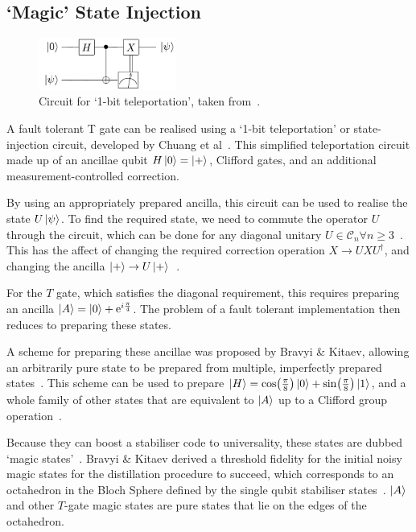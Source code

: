 \documentclass{standalone}
\begin{document}
\subsection{`Magic' State Injection}\label{sec:msi}
\begin{figure}
    \centering
    \includegraphics[width=0.4\textwidth]{Figures/1-bit-Teleport.png}
\caption{Circuit for `1-bit teleportation', taken from~\cite{Zhou2000}.}
\label{fig:MSI}
\end{figure}
A fault tolerant T gate can be realised using a `1-bit teleportation' or state-injection circuit, developed by Chuang et al~\cite{Zhou2000}. This simplified teleportation circuit made up of an ancillae qubit $H\ket{0}=\ket{+}$, Clifford gates, and an additional measurement-controlled correction.
\par
By using an appropriately prepared ancilla, this circuit can be used to realise the state $U\ket{\psi}$. To find the required state, we need to commute the operator $U$ through the circuit, which can be done for any diagonal unitary $U\in\mathcal{C}_{n}\forall n\geq 3$~\cite{Zhou2000}. This has the affect of changing the required correction operation $X\rightarrow UXU^{\dagger}$, and changing the ancilla $\ket{+}\rightarrow U\ket{+}$~\cite{Zhou2000}.
\par
For the $T$ gate, which satisfies the diagonal requirement, this requires preparing an ancilla $\ket{A}=\ket{0}+\mathrm{e}^{i\frac{\pi}{4}}$. The problem of a fault tolerant implementation then reduces to preparing these states.
\par
A scheme for preparing these ancillae was proposed by Bravyi \& Kitaev, allowing an arbitrarily pure state to be prepared from multiple, imperfectly prepared states~\cite{Bravyi2005}. This scheme can be used to prepare $\ket{H}=\cos(\frac{\pi}{8})\ket{0}+\sin(\frac{\pi}{8})\ket{1}$, and a whole family of other states that are equivalent to $\ket{A}$ up to a Clifford group operation~\cite{Bravyi2005}.
\par
Because they can boost a stabiliser code to universality, these states are dubbed `magic states'~\cite{Bravyi2005}. Bravyi \& Kitaev derived a threshold fidelity for the initial noisy magic states for the distillation procedure to succeed, which corresponds to an octahedron in the Bloch Sphere defined by the single qubit stabiliser states~\cite{Bravyi2005}. $\ket{A}$ and other $T$-gate magic states are pure states that lie on the edges of the octahedron.
\end{document}
